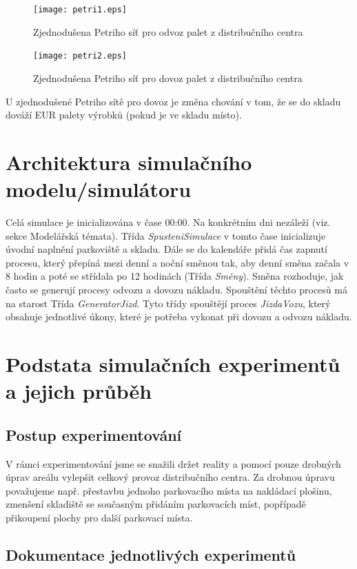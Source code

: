 \documentclass[a4paper, 11pt]{article}
\begin{document}
\begin{figure}[ht!]
\begin{center}
\texttt{[image: petri1.eps]}
\caption{Zjednodušena Petriho síť pro odvoz palet z distribučního centra}
\end{center}
\end{figure}
\newpage
\begin{figure}[ht!]
\begin{center}
\texttt{[image: petri2.eps]}
\caption{Zjednodušena Petriho síť pro dovoz palet z distribučního centra}
\end{center}
\end{figure}
U zjednodušené Petriho sítě pro dovoz je změna chování v tom, že se do skladu dováží EUR palety výrobků (pokud je ve skladu místo).

\section{Architektura simulačního modelu/simulátoru}
Celá simulace je inicializována v čase 00:00. Na konkrétním dni nezáleží (viz. sekce Modelářská témata). Třída \emph{SpusteniSimulace} v tomto čase inicializuje úvodní naplnění parkoviště a skladu. Dále se do kalendáře přidá čas zapnutí procesu, který přepíná mezi denní a noční směnou tak, aby denní směna začala v 8 hodin a poté se střídala po 12 hodinách (Třída \emph{Směny}). Směna rozhoduje, jak často se generují procesy odvozu a dovozu nákladu. Spouštění těchto procesů má na starost Třída \emph{GeneratorJizd}. Tyto třídy spouštějí proces \emph{JizdaVozu}, který obsahuje jednotlivé úkony, které je potřeba vykonat při dovozu a odvozu nákladu.

\section{Podstata simulačních experimentů a jejich průběh}
\subsection{Postup experimentování}
V rámci experimentování jsme se snažili držet reality a pomocí pouze drobných úprav areálu vylepšit celkový provoz distribučního centra. Za drobnou úpravu považujeme např. přestavbu jednoho parkovacího místa na nakládací plošinu, zmenšení skladiště se současným přidáním parkovacích míst, popřípadě přikoupení plochy pro další parkovací místa.

\subsection{Dokumentace jednotlivých experimentů}
\end{document}
